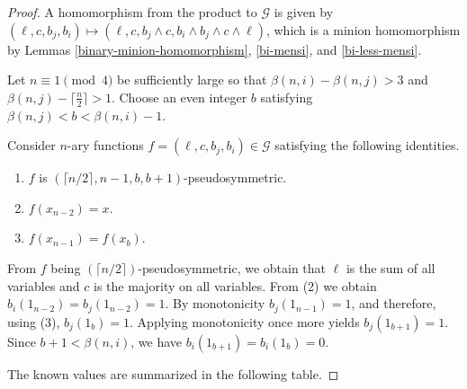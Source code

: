 \documentclass{amsart}
\numberwithin{equation}{section}
\theoremstyle{plain}
\theoremstyle{definition}
\def\minion#1{\mathcal{#1}}
\begin{document}
\begin{proof}

A homomorphism from the product to $\minion{G}$ is given by $(\ell,c,b_j,b_i)\mapsto (\ell, c, b_j\wedge c, b_i\wedge b_j\wedge c\wedge \ell)$, which is a minion homomorphism by Lemmas \ref{binary-minion-homomorphism}, \ref{bi-mensi}, and \ref{bi-less-mensi}.

Let $n\equiv 1\pmod 4$ be sufficiently large so that $\beta(n,i) - \beta(n,j) > 3$ and $\beta(n,j)-\lceil\frac{n}{2}\rceil > 1$. Choose an even integer $b$ satisfying $ \beta(n,j) < b <\beta(n,i)-1$.

Consider $n$-ary functions $f = (\ell,c,b_j,b_i)\in\minion{G}$ satisfying the following identities.
\begin{enumerate}
    \item $f$ is $(\lceil n/2\rceil, n-1, b, b+1)$-pseudosymmetric.
    \item $f(x_{n-2}) = x$.
    \item $f(x_{n-1}) = f(x_{b})$.
\end{enumerate}

From $f$ being $(\lceil n/2\rceil)$-pseudosymmetric, we obtain that $\ell$ is the sum of all variables and $c$ is the majority on all variables. From (2) we obtain $b_i(1_{n-2}) = b_j(1_{n-2}) = 1$. By monotonicity $b_j(1_{n-1}) = 1$, and therefore, using (3), $b_j(1_b)=1$. Applying monotonicity once more yields $b_j(1_{b+1}) = 1$. Since $b+1 < \beta(n,i)$, we have $b_i(1_{b+1}) = b_i(1_{b}) = 0$.

The known values are summarized in the following table.


\end{proof}
\end{document}
